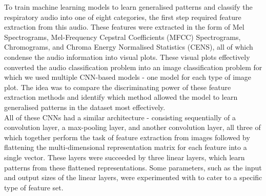\documentclass[10pt,twocolumn,letterpaper]{article}
\begin{document}
To train machine learning models to learn generalised patterns and classify the respiratory audio into one of eight categories, the first step required feature extraction from this audio. These features were extracted in the form of Mel Spectrograms, Mel-Frequency Cepstral Coefficients (MFCC) Spectrograms, Chromograms, and Chroma Energy Normalised Statistics (CENS), all of which condense the audio information into visual plots. These visual plots effectively converted the audio classification problem into an image classification problem for which we used multiple CNN-based models - one model for each type of image plot. The idea was to compare the discriminating power of these feature extraction methods and identify which method allowed the model to learn generalised patterns in the dataset most effectively.
\\All of these CNNs had a similar architecture - consisting sequentially of a convolution layer, a max-pooling layer, and another convolution layer, all three of which together perform the task of feature extraction from images followed by flattening the multi-dimensional representation matrix for each feature into a single vector. These layers were succeeded by three linear layers, which learn patterns from these flattened representations. Some parameters, such as the input and output sizes of the linear layers, were experimented with to cater to a specific type of feature set.
\end{document}
